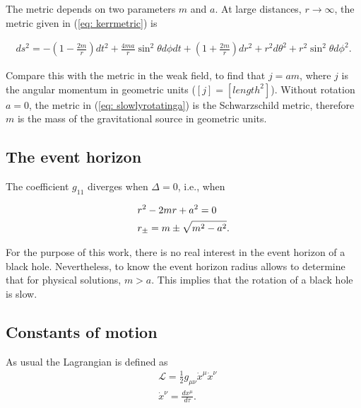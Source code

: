 The metric depends on two parameters $m$ and $a$. At large distances, $r \rightarrow \infty$, the metric given in (\ref{eq: kerrmetric}) is

\begin{align}
	ds^2 = -\left(1-\frac{2m}{r}\right) dt^2 +\frac{4ma}{r} \sin^2\theta d\phi dt +\left(1+\frac{2m}{r}\right)dr^2 + r^2 d\theta^2 + r^2\sin^2\theta d\phi^2.
	\label{eq: slowlyrotatinga}
\end{align}

Compare this with the metric in the weak field, to find that $j = am$, where $j$ is the angular momentum in geometric units ($[j] = [length^2]$). Without rotation $a=0$, the metric in (\ref{eq: slowlyrotatinga}) is the Schwarzschild metric, therefore $m$ is the mass of the gravitational source in geometric units.

\subsection*{The event horizon}
The coefficient $g_{11}$ diverges when $\Delta = 0$, i.e., when

\begin{align}
\notag
	&r^2 - 2mr +a^2 = 0\\
\label{eq: eventhorizonkerr}
	&r_{\pm} = m \pm \sqrt{m^2-a^2}.
\end{align}

For the purpose of this work, there is no real interest in the event horizon of a black hole. Nevertheless, to know the event horizon radius allows to determine that for physical solutions, $m > a$. This implies that the rotation of a black hole is slow.\\

\subsection*{Constants of motion}

As usual the Lagrangian is defined as
\begin{align*}
	&\mathcal{L} = \frac{1}{2}g_{\mu\nu}\dot{x}^\mu\dot{x}^\nu\\
	&\dot{x}^\nu = \frac{d x^\mu}{d \tau}.
\end{align*}

